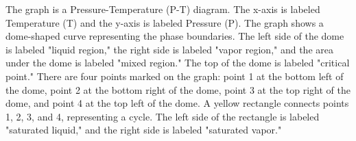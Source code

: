 The graph is a Pressure-Temperature (P-T) diagram. The x-axis is labeled Temperature (T) and the y-axis is labeled Pressure (P). The graph shows a dome-shaped curve representing the phase boundaries. The left side of the dome is labeled "liquid region," the right side is labeled "vapor region," and the area under the dome is labeled "mixed region." The top of the dome is labeled "critical point." There are four points marked on the graph: point 1 at the bottom left of the dome, point 2 at the bottom right of the dome, point 3 at the top right of the dome, and point 4 at the top left of the dome. A yellow rectangle connects points 1, 2, 3, and 4, representing a cycle. The left side of the rectangle is labeled "saturated liquid," and the right side is labeled "saturated vapor."